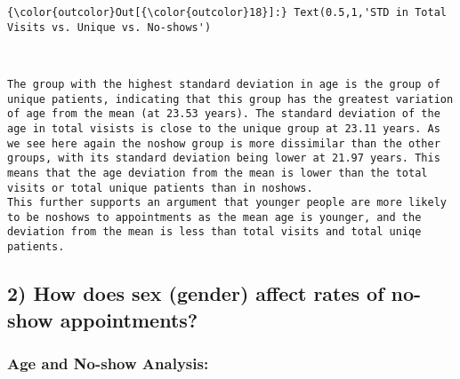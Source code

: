 \documentclass[11pt]{article}
\begin{document}
\begin{Verbatim}[commandchars=\\\{\}]
{\color{outcolor}Out[{\color{outcolor}18}]:} Text(0.5,1,'STD in Total Visits vs. Unique vs. No-shows')
\end{Verbatim}
            
    \begin{center}
    \end{center}
    { \hspace*{\fill} \\}
    
    \begin{verbatim}
The group with the highest standard deviation in age is the group of unique patients, indicating that this group has the greatest variation of age from the mean (at 23.53 years). The standard deviation of the age in total visists is close to the unique group at 23.11 years. As we see here again the noshow group is more dissimilar than the other groups, with its standard deviation being lower at 21.97 years. This means that the age deviation from the mean is lower than the total visits or total unique patients than in noshows. 
This further supports an argument that younger people are more likely to be noshows to appointments as the mean age is younger, and the deviation from the mean is less than total visits and total uniqe patients. 
\end{verbatim}

    \subsection{2) How does sex (gender) affect rates of no-show
appointments?}\label{how-does-sex-gender-affect-rates-of-no-show-appointments}

    \subsubsection{Age and No-show
Analysis:}\label{age-and-no-show-analysis}
\end{document}
